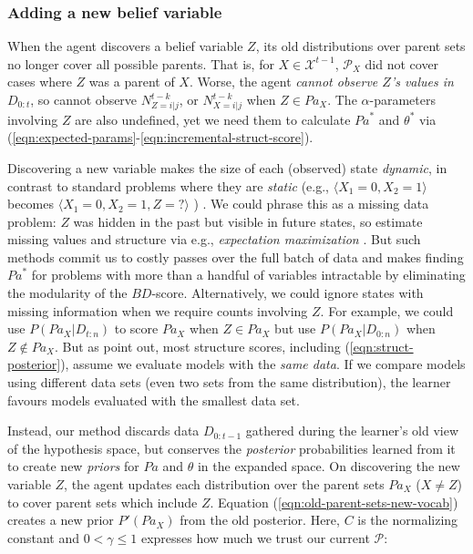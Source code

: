 \documentclass{article}
\newcommand{\Pa}{\mathit{Pa}}
\begin{document}
	\subsubsection{Adding a new belief variable}
			
	When the agent discovers a belief variable $Z$, its old distributions over parent sets no longer cover all possible parents. That is, for $X \in \mathcal{X}^{t-1}$, $\mathcal{P}_{X}$ did not cover cases where $Z$ was a parent of $X$. Worse, the agent \emph{cannot observe $Z$'s values in $D_{0:t}$}, so cannot observe $N^{t-k}_{Z  = i| j}$, or $N^{t-k}_{X = i | j}$ when $Z \in \Pa_X$. The $\alpha$-parameters involving $Z$ are also undefined, yet we need them to calculate $\Pa^*$ and $\theta^*$ via (\ref{eqn:expected-params}-\ref{eqn:incremental-struct-score}).
	
	Discovering a new variable makes the size of each (observed) state \emph{dynamic}, in contrast to standard problems where they are \emph{static} (e.g., $\langle X_1 = 0, X_2 = 1 \rangle$ becomes $\langle X_1 = 0, X_2 = 1, Z = ?\rangle$ ) . We could phrase this as a missing data problem: $Z$ was hidden in the past but visible in future states, so estimate missing values and structure via e.g., \emph{expectation maximization} \cite{friedman_bayesian_1998}. But such methods commit us to costly passes over the full batch of data and makes finding $\Pa^*$ for problems with more than a handful of variables intractable by eliminating the modularity of the $BD$-score. Alternatively, we could ignore states with missing information when we require counts involving $Z$. For example, we could use $P(\Pa_{X} | D_{t:n})$ to score $\Pa_{X}$ when $Z \in \Pa_{X}$ but use $P(\Pa_{X} | D_{0:n})$ when $Z \notin \Pa_{X}$. But as \citet{friedman_sequential_1997} point out, most structure scores, including (\ref{eqn:struct-posterior}), assume we evaluate models with the \emph{same data}. If we compare models using different data sets (even two sets from the same distribution), the learner favours models evaluated with the smallest data set.
	
	Instead, our method discards data $D_{0:t-1}$ gathered during the learner's old view of the hypothesis space, but conserves the \emph{posterior} probabilities learned from it to create new \emph{priors} for $\Pa$ and $\theta$ in the expanded space. On discovering the new variable $Z$, the agent updates each distribution over the parent sets $\Pa_X$ ($X \neq Z$) to cover parent sets which include $Z$. Equation (\ref{eqn:old-parent-sets-new-vocab}) creates a new prior $P'(\Pa_X)$ from the old posterior. Here, $C$ is the normalizing constant and $0 < \gamma \leq 1$ expresses how much we trust our current $\mathcal{P}$:
	
\end{document}

